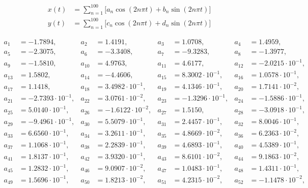\begin{align*}
x(t) &= \sum\limits_{n=1}^{ 100 } \Big[ a_n \cos(2n\pi t) + b_n \sin(2n\pi t) \Big] \\ 
y(t) &= \sum\limits_{n=1}^{ 100 } \Big[ c_n \cos(2n\pi t) + d_n \sin(2n\pi t) \Big] 
\end{align*}

\begin{align*}
a_{ 1 } &= -1.7894, & a_{ 2 } &= 1.4191, & a_{ 3 } &= 1.0708, & a_{ 4 } &= 1.4959,\\ 
a_{ 5 } &= -2.3075, & a_{ 6 } &= -3.3408, & a_{ 7 } &= -9.3283, & a_{ 8 } &= -1.3977,\\ 
a_{ 9 } &= -1.5810, & a_{ 10 } &= 4.9763, & a_{ 11 } &= 4.6177, & a_{ 12 } &= -2.0215 \cdot 10^{ -1 },\\ 
a_{ 13 } &= 1.5802, & a_{ 14 } &= -4.4606, & a_{ 15 } &= 8.3002 \cdot 10^{ -1 }, & a_{ 16 } &= 1.0578 \cdot 10^{ -1 },\\ 
a_{ 17 } &= 1.1418, & a_{ 18 } &= 3.4982 \cdot 10^{ -1 }, & a_{ 19 } &= 4.1346 \cdot 10^{ -1 }, & a_{ 20 } &= 1.7141 \cdot 10^{ -2 },\\ 
a_{ 21 } &= -2.7393 \cdot 10^{ -1 }, & a_{ 22 } &= 3.0761 \cdot 10^{ -2 }, & a_{ 23 } &= -1.3296 \cdot 10^{ -1 }, & a_{ 24 } &= -1.5886 \cdot 10^{ -1 },\\ 
a_{ 25 } &= 5.0140 \cdot 10^{ -1 }, & a_{ 26 } &= -1.6122 \cdot 10^{ -2 }, & a_{ 27 } &= 1.5150, & a_{ 28 } &= -3.0918 \cdot 10^{ -1 },\\ 
a_{ 29 } &= -9.4961 \cdot 10^{ -1 }, & a_{ 30 } &= 5.5079 \cdot 10^{ -1 }, & a_{ 31 } &= 2.4457 \cdot 10^{ -1 }, & a_{ 32 } &= 8.0046 \cdot 10^{ -1 },\\ 
a_{ 33 } &= 6.6560 \cdot 10^{ -1 }, & a_{ 34 } &= 3.2611 \cdot 10^{ -1 }, & a_{ 35 } &= 4.8669 \cdot 10^{ -2 }, & a_{ 36 } &= 6.2363 \cdot 10^{ -2 },\\ 
a_{ 37 } &= 1.1068 \cdot 10^{ -1 }, & a_{ 38 } &= 2.2839 \cdot 10^{ -1 }, & a_{ 39 } &= 4.6893 \cdot 10^{ -1 }, & a_{ 40 } &= 4.5389 \cdot 10^{ -1 },\\ 
a_{ 41 } &= 1.8137 \cdot 10^{ -1 }, & a_{ 42 } &= 3.9320 \cdot 10^{ -1 }, & a_{ 43 } &= 8.6101 \cdot 10^{ -2 }, & a_{ 44 } &= 9.1863 \cdot 10^{ -2 },\\ 
a_{ 45 } &= 1.2832 \cdot 10^{ -1 }, & a_{ 46 } &= 9.0907 \cdot 10^{ -2 }, & a_{ 47 } &= 1.0483 \cdot 10^{ -1 }, & a_{ 48 } &= 1.4311 \cdot 10^{ -1 },\\ 
a_{ 49 } &= 1.5696 \cdot 10^{ -1 }, & a_{ 50 } &= 1.8213 \cdot 10^{ -2 }, & a_{ 51 } &= 4.2315 \cdot 10^{ -2 }, & a_{ 52 } &= -1.1478 \cdot 10^{ -2 },\\ 

\end{align*}
